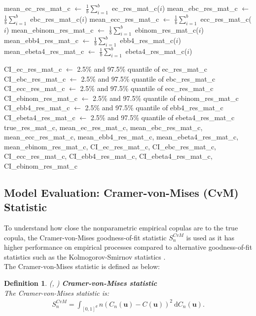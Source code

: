 \documentclass[12pt]{report}
\newtheorem{definition}{Definition}[subsection]
\newcommand{\1}{\mathbf{1}}
\begin{document}
\begin{flushleft}
\begin{algorithm}[H]
\begin{algorithmic}
    \EndFor
    \State mean\_ec\_res\_mat\_c $\gets$ $\frac{1}{b}\sum\limits_{i = 1}^{b}$ ec\_res\_mat\_c($i$)
    \State mean\_ebc\_res\_mat\_c $\gets$ $\frac{1}{b}\sum\limits_{i = 1}^{b}$ ebc\_res\_mat\_c($i$)
    \State mean\_ecc\_res\_mat\_c $\gets$ $\frac{1}{b}\sum\limits_{i = 1}^{b}$ ecc\_res\_mat\_c($i$)
    \State mean\_ebinom\_res\_mat\_c $\gets$ $\frac{1}{b}\sum\limits_{i = 1}^{b}$ ebinom\_res\_mat\_c($i$)
    \State mean\_ebb4\_res\_mat\_c $\gets$ $\frac{1}{b}\sum\limits_{i = 1}^{b}$ ebb4\_res\_mat\_c($i$)
    \State mean\_ebeta4\_res\_mat\_c $\gets$ $\frac{1}{b}\sum\limits_{i = 1}^{b}$ ebeta4\_res\_mat\_c($i$)

    \State CI\_ec\_res\_mat\_c $\gets$ 2.5\% and 97.5\% quantile of ec\_res\_mat\_c
    \State CI\_ebc\_res\_mat\_c $\gets$ 2.5\% and 97.5\% quantile of ebc\_res\_mat\_c
    \State CI\_ecc\_res\_mat\_c $\gets$ 2.5\% and 97.5\% quantile of ecc\_res\_mat\_c
    \State CI\_ebinom\_res\_mat\_c $\gets$ 2.5\% and 97.5\% quantile of ebinom\_res\_mat\_c
    \State CI\_ebb4\_res\_mat\_c $\gets$ 2.5\% and 97.5\% quantile of ebb4\_res\_mat\_c
    \State CI\_ebeta4\_res\_mat\_c $\gets$ 2.5\% and 97.5\% quantile of ebeta4\_res\_mat\_c
    \State \Return true\_res\_mat\_c, mean\_ec\_res\_mat\_c, mean\_ebc\_res\_mat\_c, mean\_ecc\_res\_mat\_c, mean\_ebb4\_res\_mat\_c, mean\_ebeta4\_res\_mat\_c, mean\_ebinom\_res\_mat\_c, CI\_ec\_res\_mat\_c, CI\_ebc\_res\_mat\_c, CI\_ecc\_res\_mat\_c, CI\_ebb4\_res\_mat\_c, CI\_ebeta4\_res\_mat\_c, CI\_ebinom\_res\_mat\_c
\EndProcedure
\end{algorithmic}
\end{algorithm}

\subsection{Model Evaluation: Cramer-von-Mises (CvM) Statistic}
\vspace{0.5cm}
To understand how close the nonparametric empirical copulas are to the true copula, the Cramer-von-Mises goodness-of-fit statistic $S_{n}^{CvM}$ is used as it has higher performance on empirical processes compared to alternative goodness-of-fit statistics such as the Kolmogorov-Smirnov statistics \parencite{GenestRemillardBeaudoinGOF2009}.\\
\vspace{0.5cm}
The Cramer-von-Mises statistic is defined as below:

\begin{definition}\label{CvMStatistics}
\textit{\normalfont(\cite{HofertBook}, \cite{GenestRemillardBeaudoinGOF2009})}\:
\textbf{Cramer-von-Mises statistic} \\
The Cramer-von-Mises statistic is:
\begin{align*}
S_{n}^{CvM} = \int_{[0,1]^d} n(C_{n}(\boldsymbol{u}) - C(\boldsymbol{u}))^{2} \: \mathrm{d}C_{n}(\boldsymbol{u}).
\end{align*}
\end{definition}


\end{flushleft}
\end{document}
